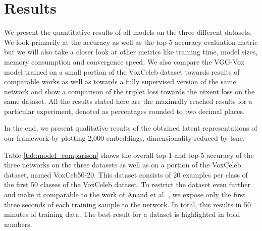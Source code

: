 \section{Results}

We present the quantitative results of all models on the three different datasets. We look primarily at the accuracy as well as the top-5 accuracy evaluation metric but we will also take a closer look at other metrics like training time, model sizes, memory consumption and convergence speed. We also compare the VGG-Vox model trained on a small portion of the VoxCeleb dataset towards results of comparable works as well as towards a fully supervised version of the same network and show a comparison of the triplet loss towards the \gls{ntxent} loss on the same dataset. All the results stated here are the maximally reached results for a particular experiment, denoted as percentages rounded to two decimal places. 

In the end, we present qualitative results of the obtained latent representations of our framework by plotting 2,000 embeddings, dimensionality-reduced by \gls{tsne}.

Table \ref{tab:model_comparison} shows the overall top-1 and top-5 accuracy of the three networks on the three datasets as well as on a portion of the VoxCeleb dataset, named VoxCeb50-20. This dataset consists of 20 examples per class of the first 50 classes of the VoxCeleb dataset. To restrict the dataset even further and make it comparable to the work of Anand et al. \cite{anand2019shot}, we expose only the first three seconds of each training sample to the network. In total, this results in 50 minutes of training data. The best result for a dataset is highlighted in bold numbers.

